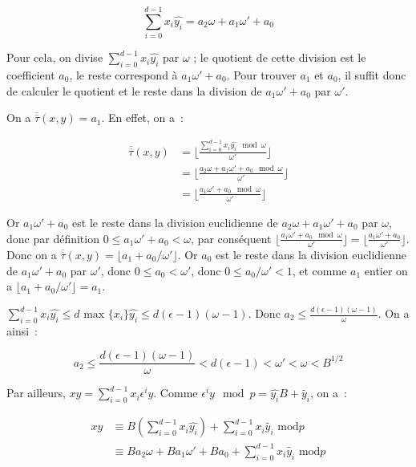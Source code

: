     $$ \sum_{i=0}^{d-1} x_i \hat{y_i} = a_2\omega + a_1\omega' + a_0 $$

    Pour cela, on divise $\sum_{i=0}^{d-1} x_i \hat{y_i}$ par $\omega$ ; le quotient de cette division est le coefficient $a_0$, le reste correspond à $a_1\omega' + a_0$. Pour trouver $a_1$ et $a_0$, il suffit donc de calculer le quotient et le reste dans la division de $a_1\omega' + a_0$ par $\omega'$.

    On a $\overline{\overline{\tau}}(x,y) = a_1$. En effet, on a~:

    \begin{align*}
    \overline{\overline{\tau}}(x,y) &= \lfloor \frac{\sum_{i=0}^{d-1} x_i \hat{y_i}\mod \omega}{\omega'} \rfloor \\
                                    &= \lfloor \frac{a_2\omega + a_1\omega' + a_0\mod \omega}{\omega'} \rfloor \\
                                    &= \lfloor \frac{a_1\omega' + a_0\mod \omega}{\omega'} \rfloor
    \end{align*}

    Or $a_1\omega' + a_0$ est le reste dans la division euclidienne de $a_2\omega + a_1\omega' + a_0$ par $\omega$, donc par définition $0 \leq a_1\omega' + a_0 <  \omega$, par conséquent $\lfloor \frac{a_1\omega' + a_0\mod \omega}{\omega'} \rfloor = \lfloor \frac{a_1\omega' + a_0}{\omega'} \rfloor$. Donc on a $\overline{\overline{\tau}}(x,y) = \lfloor a_1 + a_0/\omega' \rfloor$. Or $a_0$ est le reste dans la division euclidienne de $a_1\omega' + a_0$ par $\omega'$, donc $0 \leq a_0 < \omega'$, donc $0 \leq a_0/\omega' < 1$, et comme $a_1$ entier on a $\lfloor a_1 + a_0/\omega' \rfloor = a_1$.

    $\sum_{i=0}^{d-1} x_i \hat{y_i} \leq d \text{\ max }\{x_i\} \hat{y_i} \leq d(\epsilon - 1)(\omega - 1)$. Donc $a_2 \leq \frac{d(\epsilon - 1)(\omega - 1)}{\omega}$. On a ainsi~:

    $$a_2 \leq \frac{d(\epsilon - 1)(\omega - 1)}{\omega} < d(\epsilon - 1) < \omega' < \omega < B^{1/2} $$

    Par ailleurs, $xy = \sum_{i=0}^{d-1} x_i \epsilon^i y$. Comme $\epsilon^i y\mod p = \hat{y_i} B + \tilde{y_i}$, on a~:

    \begin{align*}
        xy &\equiv B(\sum_{i=0}^{d-1} x_i \hat{y_i}) + \sum_{i=0}^{d-1} x_i \tilde{y_i} \text{\ mod} p \\
           &\equiv B a_2\omega + B a_1\omega' + B a_0 + \sum_{i=0}^{d-1} x_i \tilde{y_i} \text{\ mod} p
    \end{align*}

